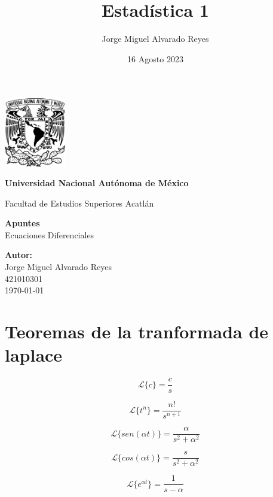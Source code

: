 \documentclass{article}
\title{Estadística 1}
\author{Jorge Miguel Alvarado Reyes}
\date{16 Agosto 2023}
\begin{document}
\begin{titlepage}
    \begin{center}
        \includegraphics[width=0.2\textwidth]{../../unam.png}
        \vspace*{.5cm}

        \LARGE
        \textbf{Universidad Nacional Autónoma de México}

        \vspace{0.5cm}
        \LARGE
        Facultad de Estudios Superiores Acatlán

        \vspace{2cm}

        \textbf{Apuntes} \\
        Ecuaciones Diferenciales

        \vfill

        \vspace{1cm}

        \textbf{\large Autor:} \\
        Jorge Miguel Alvarado Reyes \\
        421010301\\
        \vspace{.5cm}
        \normalsize \today

    \end{center}
\end{titlepage}
\newpage

\tableofcontents


\section{Teoremas de la tranformada de laplace}

\[
    \mathcal{L}\{c\} = \frac{c}{s}
\]

\[
    \mathcal{L}\{t^n\} = \frac{n!}{s^{n+1}}
\]

\[
    \mathcal{L}\{sen(\alpha t)\} = \frac{\alpha}{s^2 + \alpha^2}
\]

\[
    \mathcal{L}\{cos(\alpha t)\} = \frac{s}{s^2 + \alpha^2}
\]

\[
    \mathcal{L}\{e^{\alpha t}\} = \frac{1}{s - \alpha}
\]
\end{document}
